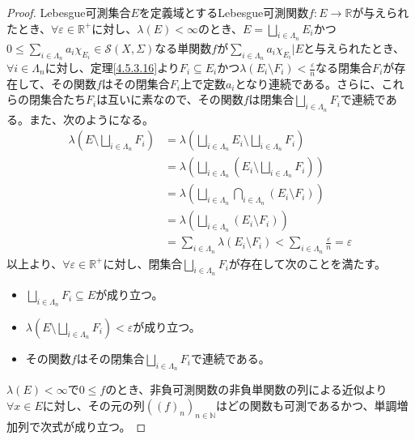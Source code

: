 \documentclass[dvipdfmx]{jsarticle}
\begin{document}
\begin{proof}
Lebesgue可測集合$E$を定義域とするLebesgue可測関数$f:E \rightarrow \mathbb{R}$が与えられたとき、$\forall\varepsilon \in \mathbb{R}^{+}$に対し、$\lambda(E) < \infty$のとき、$E = \bigsqcup_{i \in \varLambda_{n}} E_{i}$かつ$0 \leq \sum_{i \in \varLambda_{n}} {a_{i}\chi_{E_{i}}}\in \mathcal{S}(X,\varSigma)$なる単関数$f$が$\sum_{i \in \varLambda_{n}} {a_{i}\chi_{E_{i}}}|E$と与えられたとき、$\forall i \in \varLambda_{n}$に対し、定理\ref{4.5.3.16}より$F_{i} \subseteq E_{i}$かつ$\lambda\left( E_{i} \setminus F_{i} \right) < \frac{\varepsilon}{n}$なる閉集合$F_{i}$が存在して、その関数$f$はその閉集合$F_{i}$上で定数$a_{i}$となり連続である。さらに、これらの閉集合たち$F_{i}$は互いに素なので、その関数$f$は閉集合$\bigsqcup_{i \in \varLambda_{n}} F_{i}$で連続である。また、次のようになる。
\begin{align*}
\lambda\left( E \setminus \bigsqcup_{i \in \varLambda_{n}} F_{i} \right) &= \lambda\left( \bigsqcup_{i \in \varLambda_{n}} E_{i} \setminus \bigsqcup_{i \in \varLambda_{n}} F_{i} \right)\\
&= \lambda\left( \bigsqcup_{i \in \varLambda_{n}} \left( E_{i} \setminus \bigsqcup_{i \in \varLambda_{n}} F_{i} \right) \right)\\
&= \lambda\left( \bigsqcup_{i \in \varLambda_{n}} {\bigcap_{i \in \varLambda_{n}} \left( E_{i} \setminus F_{i} \right)} \right)\\
&= \lambda\left( \bigsqcup_{i \in \varLambda_{n}} \left( E_{i} \setminus F_{i} \right) \right)\\
&= \sum_{i \in \varLambda_{n}} {\lambda\left( E_{i} \setminus F_{i} \right)} < \sum_{i \in \varLambda_{n}} \frac{\varepsilon}{n} = \varepsilon
\end{align*}
以上より、$\forall\varepsilon \in \mathbb{R}^{+}$に対し、閉集合$\bigsqcup_{i \in \varLambda_{n}} F_{i}$が存在して次のことを満たす。
\begin{itemize}
\item
  $\bigsqcup_{i \in \varLambda_{n}} F_{i} \subseteq E$が成り立つ。
\item
  $\lambda\left( E \setminus \bigsqcup_{i \in \varLambda_{n}} F_{i} \right) < \varepsilon$が成り立つ。
\item
  その関数$f$はその閉集合$\bigsqcup_{i \in \varLambda_{n}} F_{i}$で連続である。
\end{itemize}\par
$\lambda(E) < \infty$で$0 \leq f$のとき、非負可測関数の非負単関数の列による近似より$\forall x \in E$に対し、その元の列$\left( (f)_{n} \right)_{n \in \mathbb{N}}$はどの関数も可測であるかつ、単調増加列で次式が成り立つ。

\end{proof}
\end{document}
